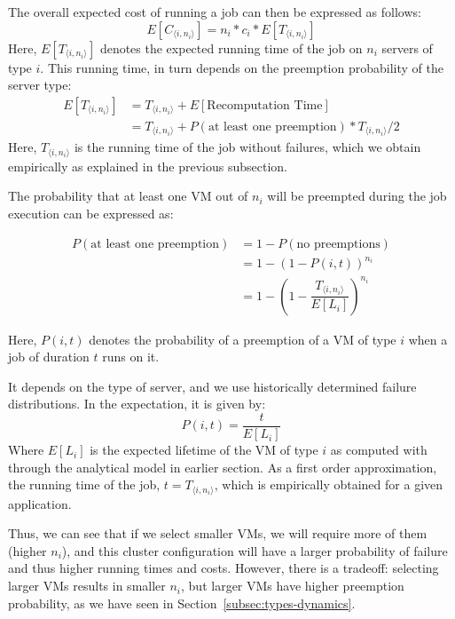 The overall expected cost of running a job can then be expressed as follows:
\begin{equation}
  \label{eq:e-cost}
  E[C_{\langle i,n_i \rangle}] = n_i*c_i * E[T_{\langle i,n_i \rangle}]
\end{equation}
Here, $E[T_{\langle i,n_i \rangle}]$ denotes the expected running time of the job on $n_i$ servers of type $i$.
This running time, in turn depends on the preemption probability of the server type:
\begin{align}
  \label{eq:et1}
  E[T_{\langle i,n_i \rangle}] &= T_{\langle i,n_i \rangle} + E[\text{Recomputation Time}] \\
  &= T_{\langle i,n_i \rangle} + P(\text{at least one preemption})*T_{\langle i,n_i \rangle}/2   
\end{align}
Here, $T_{\langle i,n_i \rangle}$ is the running time of the job without failures, which we obtain empirically as explained in the previous subsection.

The probability that at least one VM out of $n_i$ will be preempted during the job execution can be expressed as:

\begin{align}
  \label{eq:pfail1}
  P(\text{at least one preemption}) &= 1-P(\text{no preemptions}) \\
                                 &= 1-(1-P(i, t))^{n_i} \\
                                 &= 1-\left(1-\dfrac{T_{\langle i,n_i \rangle}}{E[L_i]}\right)^{n_i}      
\end{align}

Here, $P(i, t)$ denotes the probability of a preemption of a VM of type $i$ when a job of duration $t$ runs on it. 

It depends on the type of server, and we use historically determined failure distributions.
In the expectation, it is given by:
\begin{equation}
  \label{eq:pi}
  P(i, t) = \dfrac{t}{E[L_i]}
\end{equation}
Where $E[L_i]$ is the expected lifetime of the VM of type $i$ as computed with through the analytical model in earlier section.
As a first order approximation, the running time of the job, $t=T_{\langle i,n_i \rangle}$, which is empirically obtained for a given application. 


Thus, we can see that if we select smaller VMs, we will require more of them (higher $n_i$), and this cluster configuration will have a larger probability of failure and thus higher running times and costs.
However, there is a tradeoff: selecting larger VMs results in smaller $n_i$, but larger VMs have higher preemption probability, as we have seen in Section~\ref{subsec:types-dynamics}. 



